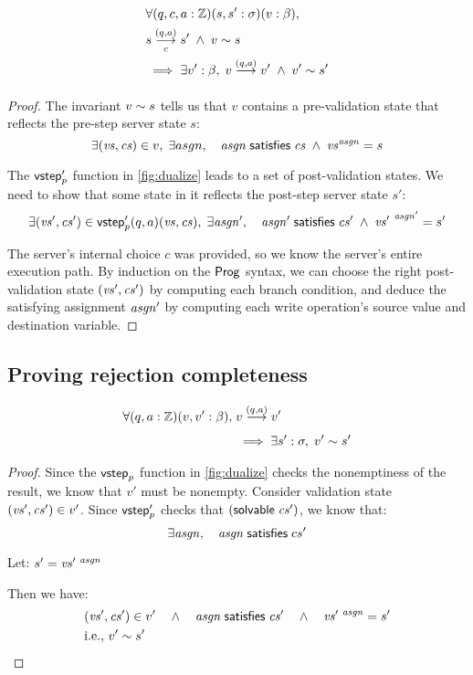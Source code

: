 \begin{lemma}[\ref{eq:rs2}]
  \begin{align*}
    &\forall(q,c,a:\Int)(s,s':\sigma)(v:\beta),\\
    &\triggers sc{(q,a)}s'\;\wedge\;\Reflects{v}{s}\\
    &\implies\exists v':\beta,\;\behaves v{(q,a)}v'\;\wedge\;\Reflects{v'}{s'}
  \end{align*}
\begin{proof}
The invariant $v\sim s$ tells us that $v$ contains a pre-validation
state that reflects the pre-step server state $s$:
\[\exists(\mathit{vs},\mathit{cs})\in v,\;\exists asgn,\quad\mathit{asgn}\;\mathsf{satisfies}\;\mathit{cs}\;\wedge\;{\mathit{vs}}^{\mathit{asgn}}=s\]

The $\mathsf{vstep}'_p$ function in \autoref{fig:dualize} leads to a set of
post-validation states.  We need to show that some state in it reflects the
post-step server state $s'$:
\[\exists(\mathit{vs}',\mathit{cs}')\in\mathsf{vstep}_p'(q,a)(\mathit{vs},\mathit{cs}),\;\exists\mathit{asgn}',\quad\mathit{asgn}'\;\mathsf{satisfies}\;\mathit{cs}'\;\wedge\;{\mathit{vs}'}^{~\mathit{asgn}'}=s'\]

The server's internal choice $c$ was provided, so we know the server's entire
execution path.  By induction on the $\mathsf{Prog}$ syntax, we can choose the right
post-validation state $(\mathit{vs}',\mathit{cs}')$ by computing each branch condition, and
deduce the satisfying assignment $\mathit{asgn}'$ by computing each write operation's
source value and destination variable.
\end{proof}
\end{lemma}

\subsection{Proving rejection completeness}
\label{sec:proof-complete}

\begin{lemma}[\ref{eq:rc1}]
\begin{align*}
\forall(q,a:\Int)(v,v':\beta),\;&\behaves v{(q,a)}v'\\
&\implies\exists s':\sigma,\;\Reflects{v'}{s'}
\end{align*}
\begin{proof}
Since the $\mathsf{vstep}_p$ function in \autoref{fig:dualize} checks the nonemptiness
of the result, we know that $v'$ must be nonempty.  Consider validation state
$(\mathit{vs}',\mathit{cs}')\in v'$.  Since $\mathsf{vstep}'_p$ checks that $(\mathsf{solvable}\; \mathit{cs}')$, we know
that:
\[\exists \mathit{asgn},\quad\mathit{asgn}\;\mathsf{satisfies}\;cs'\]

Let:
\(s'=\mathit{vs}'^{~\mathit{asgn}}\)

Then we have:
\begin{align*}
&(\mathit{vs}',\mathit{cs}')\in v'\quad\wedge\quad\mathit{asgn}\;\mathsf{satisfies}\;\mathit{cs}'\quad\wedge\quad\mathit{vs}'^{~\mathit{asgn}}=s'\\
&\text{i.e., }v'\sim s'\tag*{\qedhere}
\end{align*}
\end{proof}
\end{lemma}

